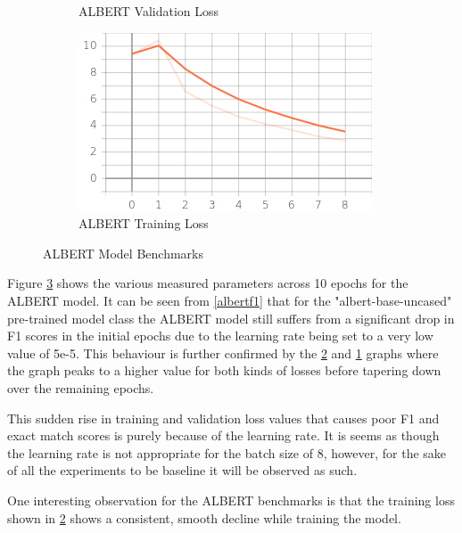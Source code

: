 \documentclass[a4paper,12pt]{report}
\begin{document}
\begin{figure}
\begin{subfigure}[b]{0.4\textwidth}
    			\caption{\small ALBERT Validation Loss}  
    			\label{albertValLoss}
    		\end{subfigure}
    		\hfill
    		\begin{subfigure}[b]{0.4\textwidth}   
    			\centering 
    			\includegraphics[width=\textwidth]{../images/Albert_Train_Loss.png}
    			\caption{\small ALBERT Training Loss}
    			\label{albertTrainLoss}
    		\end{subfigure}
    		\caption{ALBERT Model Benchmarks} 
    		\label{albertBenchmarks}
    	\end{figure}
    
    	Figure \ref{albertBenchmarks} shows the various measured parameters across 10 epochs for the ALBERT model. It can be seen from \ref{albertf1} that for the "albert-base-uncased" pre-trained model class the ALBERT model still suffers from a significant drop in F1 scores in the initial epochs due to the learning rate being set to a very low value of 5e-5. This behaviour is further confirmed by the \ref{albertTrainLoss} and \ref{albertValLoss} graphs where the graph peaks to a higher value for both kinds of losses before tapering down over the remaining epochs. 
    	
    	This sudden rise in training and validation loss values that causes poor F1 and exact match scores is purely because of the learning rate. It is seems as though the learning rate is  not appropriate for the batch size of 8, however, for the sake of all the experiments to be baseline it will be observed as such.
    	
    	One interesting observation for the ALBERT benchmarks is that the training loss shown in \ref{albertTrainLoss} shows a consistent, smooth decline while training the model.
\end{document}
